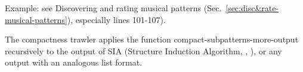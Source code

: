 \vspace{0.5cm}
\noindent Example: see Discovering and rating musical
patterns (Sec.~\ref{sec:disc&rate-musical-patterns}),
especially lines 101-107). 
\vspace{0.5cm}

\noindent The compactness trawler \citep{collins2010b}
applies the function compact-subpatterns-more-output
recursively to the output of SIA (Structure Induction
Algorithm, \citeauthor{meredith2002},
\citeyear{meredith2002}), or any output with an
analogous list format.
























